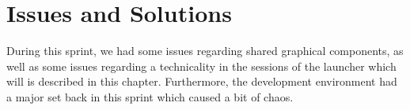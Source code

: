 \chapter{Issues and Solutions}
\label{cha:issues_and_solutions}

During this sprint, we had some issues regarding shared graphical components, as well as some issues regarding a technicality in the sessions of the launcher which will is described in this chapter. Furthermore, the development environment had a major set back in this sprint which caused a bit of chaos.











